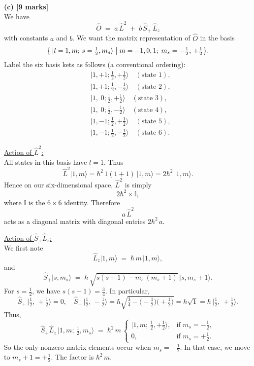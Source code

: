 \documentclass{article}
\begin{document}
\medskip

\textbf{(c) [9 marks]}\\
We have 
\[
\hat{O} 
\;=\; 
a\,\hat{L}^2 
\;+\;
b\,\hat{S}_+\,\hat{L}_z
\]
with constants \(a\) and \(b\). We want the matrix representation of \(\hat{O}\) in the basis
\[
\bigl\{\,
\lvert l=1,m;\,s=\tfrac12,m_s\rangle
\bigm|
m = -1,0,1;\; m_s = -\tfrac12,\,+\tfrac12
\bigr\}.
\]
Label the six basis kets as follows (a conventional ordering):
\[
\begin{aligned}
&\lvert 1, +1; \tfrac12, +\tfrac12\rangle \quad(\text{state 1}), \\
&\lvert 1, +1; \tfrac12, -\tfrac12\rangle \quad(\text{state 2}), \\
&\lvert 1, \;0; \tfrac12, +\tfrac12\rangle \quad(\text{state 3}), \\
&\lvert 1, \;0; \tfrac12, -\tfrac12\rangle \quad(\text{state 4}), \\
&\lvert 1, -1; \tfrac12, +\tfrac12\rangle \quad(\text{state 5}), \\
&\lvert 1, -1; \tfrac12, -\tfrac12\rangle \quad(\text{state 6}).
\end{aligned}
\]

\underline{Action of \(\hat{L}^2\):}\\
All states in this basis have \(l=1\). Thus 
\[
\hat{L}^2 \lvert 1,m\rangle = \hbar^2 \,1(1+1)\,\lvert 1,m\rangle = 2\hbar^2\,\lvert 1,m\rangle.
\]
Hence on our six-dimensional space, \(\hat{L}^2\) is simply 
\[
2\hbar^2 \times \mathbb{I},
\]
where \(\mathbb{I}\) is the \(6\times 6\) identity. Therefore 
\[
a\,\hat{L}^2
\]
acts as a diagonal matrix with diagonal entries \(2\hbar^2\,a\).

\underline{Action of \(\hat{S}_+ \hat{L}_z\):}\\
We first note 
\[
\hat{L}_z \lvert 1, m\rangle 
\;=\; \hbar \,m\,\lvert 1, m\rangle,
\]
and
\[
\hat{S}_+ \lvert s,m_s\rangle 
\;=\; \hbar\,\sqrt{s(s+1) - m_s\,(m_s+1)} \,\lvert s,m_s+1\rangle.
\]
For \(s=\tfrac12\), we have \(s(s+1)=\tfrac{3}{4}\). In particular,
\[
\hat{S}_+ \,\lvert \tfrac12,\,+\tfrac12\rangle = 0,
\quad
\hat{S}_+ \,\lvert \tfrac12,\,-\tfrac12\rangle 
= \hbar\sqrt{\tfrac34 -\bigl(-\tfrac12\bigr)\bigl(+\tfrac12\bigr)}
= \hbar\sqrt{1}
= \hbar\,\lvert \tfrac12,\,+\tfrac12\rangle.
\]
Thus,
\[
\hat{S}_+ \hat{L}_z \,\lvert 1,m;\,\tfrac12,m_s\rangle
\;=\;
\hbar^2\,m\,
\begin{cases}
\lvert 1,m;\,\tfrac12,+\tfrac12\rangle, & \text{if } m_s=-\tfrac12,\\
0, & \text{if } m_s = +\tfrac12.
\end{cases}
\]
So the only nonzero matrix elements occur when \(m_s = -\tfrac12\). In that case, we move to \(m_s+1 = +\tfrac12\). The factor is \(\hbar^2\,m\).
\end{document}
